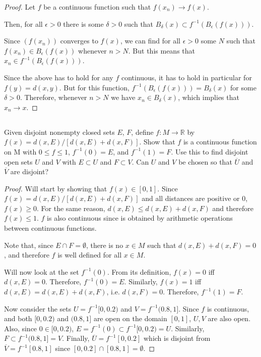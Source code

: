\begin{proof}
Let $f$ be a continuous function such that $f(x_n) \rightarrow f(x)$.

Then, for all $\epsilon > 0$ there is some $\delta > 0$ such that $B_\delta(x) \subset f^{-1}(B_\epsilon(f(x)))$. 

Since $(f(x_n))$ converges to $f(x)$, we can find for all $\epsilon > 0$ some $N$ such that $f(x_n) \in B_\epsilon(f(x))$ whenever $n>N$. But this means that $x_n \in f^{-1}(B_\epsilon(f(x)))$.

Since the above has to hold for any $f$ continuous, it has to hold in particular for $f(y) = d(x,y)$. But for this function, $f^{-1}(B_\epsilon(f(x))) = B_\delta(x)$ for some $\delta>0$. Therefore, whenever $n>N$ we have $x_n \in B_\delta(x)$, which implies that $x_n \rightarrow x$.

\end{proof}


\subsection{} Given disjoint nonempty closed sets $E$, $F$, define $f : M \rightarrow \mathbb{R}$ by $f(x) = d(x, E)/[d(x,E)+d(x,F)]$. Show that $f$ is a continuous function on M with $0 \leq f \leq 1$, $f^{-1}({0}) = E$, and $f^{-1}({1}) = F$. Use this to find disjoint open sets $U$ and $V$ with $E \subset U$ and $F \subset V$. Can $U$ and $V$ be chosen so that $\overline{U}$ and $\overline{V}$ are disjoint? 

\begin{proof}
Will start by showing that $f(x) \in [0,1]$. Since $f(x) = d(x, E)/[d(x,E)+d(x,F)]$ and all distances are positive or 0, $f(x) \geq 0$. For the same reason, $d(x, E) \leq d(x,E)+d(x,F)$ and therefore $f(x) \leq 1$. $f$ is also continuous since is obtained by arithmetic operations between continuous functions.

Note that, since $E \cap F = \emptyset$, there is no $x \in M$ such that $d(x,E)+d(x,F) = 0$, and therefore $f$ is well defined for all $x \in M$.

Will now look at the set $f^{-1}({0})$. From its definition, $f(x) = 0$ iff $d(x, E) = 0$. Therefore, $f^{-1}({0}) = E$. Similarly, $f(x) = 1$ iff $d(x, E) = d(x,E)+d(x,F)$, i.e. $d(x,F) = 0$. Therefore, $f^{-1}({1}) = F$.

Now consider the sets $U = f^{-1}[0,0.2)$ and $V = f^{-1}(0.8, 1]$. Since $f$ is continuous, and both $[0,0.2)$ and $(0.8, 1]$ are open on the domain $[0,1]$, $U,V$ are also open. Also, since $0 \in [0, 0.2)$, $E = f^{-1}(0) \subset f^{-1}[0,0.2) = U$. Similarly, $F \subset f^{-1}(0.8,1] = V$. Finally, $\overline{U} = f^{-1}[0,0.2]$ which is disjoint from $\overline{V} = f^{-1}[0.8,1]$ since $[0,0.2] \cap [0.8,1] = \emptyset$. 

\end{proof}

